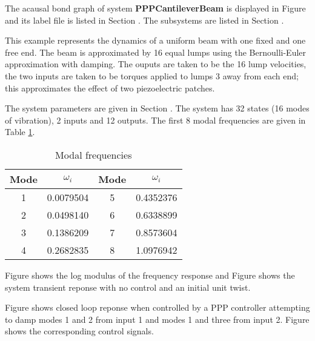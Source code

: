 

The acausal bond graph of system \textbf{PPPCantileverBeam} is displayed in
Figure  and its label file is listed in
Section .  The subsystems are listed in Section
.
   
This example represents the dynamics of a uniform beam with one fixed
and one free end.  The beam is approximated by 16 equal lumps using
the Bernoulli-Euler approximation with damping. The ouputs are taken
to be the 16 lump velocities, the two inputs are taken to be torques
applied to lumps 3 away from each end; this approximates the effect of
two piezoelectric patches.

The system parameters are given in Section
.
The system has 32 states (16 modes of vibration), 2 inputs and 12
outputs.
The first 8 modal frequencies are given in Table \ref{tab:modes}.
\begin{table}[htbp]
  \begin{center}
    \begin{tabular}{||c|c||c|c||}
      \hline
      Mode & $\omega_i$ & Mode & $\omega_i$\\
      \hline
      \hline
      1 & 0.0079504 & 5 & 0.4352376\\
      2 & 0.0498140 & 6 & 0.6338899\\
      3 & 0.1386209 & 7 & 0.8573604\\
      4 & 0.2682835 & 8 & 1.0976942\\
      \hline
    \end{tabular}
    \caption{Modal frequencies}
    \label{tab:modes}
  \end{center}
\end{table}

Figure  shows the log modulus of the frequency
response and Figure  shows the system transient
reponse with no control and an initial unit twist.

Figure  shows closed loop reponse when
controlled by a PPP controller attempting to damp modes 1 and 2 from
input 1 and modes 1 and three from input 2. Figure
 shows the corresponding control signals.







